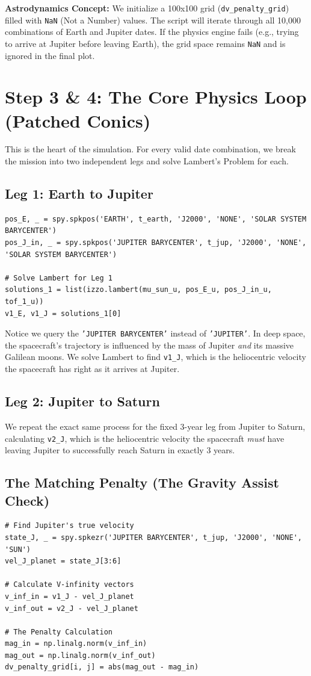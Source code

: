 \documentclass[11pt, letterpaper]{article}
\begin{document}
\textbf{Astrodynamics Concept:} We initialize a 100x100 grid (\texttt{dv\_penalty\_grid}) filled with \texttt{NaN} (Not a Number) values. The script will iterate through all 10,000 combinations of Earth and Jupiter dates. If the physics engine fails (e.g., trying to arrive at Jupiter before leaving Earth), the grid space remains \texttt{NaN} and is ignored in the final plot.

\section*{Step 3 \& 4: The Core Physics Loop (Patched Conics)}
This is the heart of the simulation. For every valid date combination, we break the mission into two independent legs and solve Lambert's Problem for each.

\subsection*{Leg 1: Earth to Jupiter}
\begin{lstlisting}[numbers=none]
pos_E, _ = spy.spkpos('EARTH', t_earth, 'J2000', 'NONE', 'SOLAR SYSTEM BARYCENTER')
pos_J_in, _ = spy.spkpos('JUPITER BARYCENTER', t_jup, 'J2000', 'NONE', 'SOLAR SYSTEM BARYCENTER')

# Solve Lambert for Leg 1
solutions_1 = list(izzo.lambert(mu_sun_u, pos_E_u, pos_J_in_u, tof_1_u))
v1_E, v1_J = solutions_1[0] 
\end{lstlisting}
Notice we query the \texttt{'JUPITER BARYCENTER'} instead of \texttt{'JUPITER'}. In deep space, the spacecraft's trajectory is influenced by the mass of Jupiter \textit{and} its massive Galilean moons. We solve Lambert to find \texttt{v1\_J}, which is the heliocentric velocity the spacecraft has right as it arrives at Jupiter.

\subsection*{Leg 2: Jupiter to Saturn}
We repeat the exact same process for the fixed 3-year leg from Jupiter to Saturn, calculating \texttt{v2\_J}, which is the heliocentric velocity the spacecraft \textit{must} have leaving Jupiter to successfully reach Saturn in exactly 3 years.

\subsection*{The Matching Penalty (The Gravity Assist Check)}
\begin{lstlisting}[numbers=none]
# Find Jupiter's true velocity
state_J, _ = spy.spkezr('JUPITER BARYCENTER', t_jup, 'J2000', 'NONE', 'SUN')
vel_J_planet = state_J[3:6]

# Calculate V-infinity vectors
v_inf_in = v1_J - vel_J_planet
v_inf_out = v2_J - vel_J_planet

# The Penalty Calculation
mag_in = np.linalg.norm(v_inf_in)
mag_out = np.linalg.norm(v_inf_out)
dv_penalty_grid[i, j] = abs(mag_out - mag_in)
\end{lstlisting}
\end{document}
